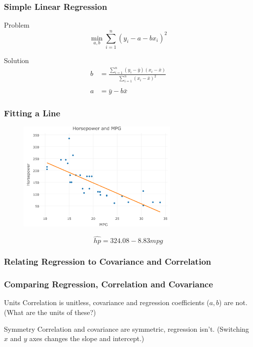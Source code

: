 \documentclass{beamer}
\begin{document}
\begin{frame}
\frametitle{Simple Linear Regression}
	\begin{block}{Problem}
	$$
	\min_{a,b}  \sum_{i = 1}^n (y_i - a - b x_i)^2
	$$
	\end{block}
	\begin{block}{Solution}
		\begin{align*}
			b &= \frac{\sum_{i = 1}^n \left(y_i - \bar{y}\right)\left(x_i - \bar{x} \right)}{\sum_{i = 1}^n 				\left(x_i - \bar{x}\right)^2}
			\\
			\\
			a &= \bar{y} - b\bar{x}
		\end{align*}
	\end{block}
\end{frame}

\begin{frame}
\frametitle{Fitting a Line}
	\begin{figure}
		\includegraphics[width = 0.7\textwidth]{./images/carsFitted.png}
	\end{figure}
	$$
	\widehat{hp} = 324.08 - 8.83 mpg
	$$
\end{frame}

\begin{frame}
\frametitle{Relating Regression to Covariance and Correlation}
\end{frame}

\begin{frame}
\frametitle{Comparing Regression, Correlation and Covariance}
	\begin{block}{Units}
	Correlation is unitless, covariance and regression coefficients ($a, b$) are not. (What are the 			units of these?)
	\end{block}
	\begin{block}{Symmetry}
	Correlation and covariance are symmetric, regression isn't. (Switching $x$ and $y$ axes changes 		the slope and intercept.)
	\end{block}
\end{frame}
\end{document}
